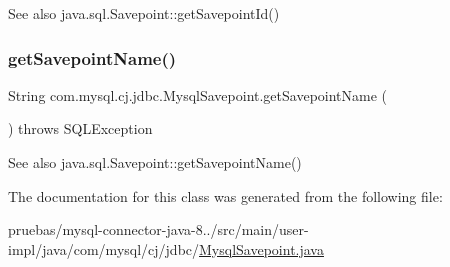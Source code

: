\begin{DoxySeeAlso}{See also}
java.\+sql.\+Savepoint\+::get\+Savepoint\+Id() 
\end{DoxySeeAlso}
\mbox{\label{classcom_1_1mysql_1_1cj_1_1jdbc_1_1_mysql_savepoint_a1888db0eac58d2eb0d3394ea3c38d601}} 
\subsubsection{\texorpdfstring{get\+Savepoint\+Name()}{getSavepointName()}}
{\footnotesize\ttfamily String com.\+mysql.\+cj.\+jdbc.\+Mysql\+Savepoint.\+get\+Savepoint\+Name (\begin{DoxyParamCaption}{ }\end{DoxyParamCaption}) throws S\+Q\+L\+Exception}

\begin{DoxySeeAlso}{See also}
java.\+sql.\+Savepoint\+::get\+Savepoint\+Name() 
\end{DoxySeeAlso}


The documentation for this class was generated from the following file\+:\begin{DoxyCompactItemize}
\item 
pruebas/mysql-\/connector-\/java-\/8../src/main/user-\/impl/java/com/mysql/cj/jdbc/\mbox{\hyperlink{_mysql_savepoint_8java}{Mysql\+Savepoint.\+java}}\end{DoxyCompactItemize}
